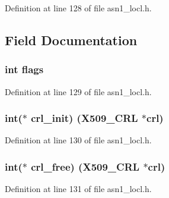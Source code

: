 Definition at line 128 of file asn1\+\_\+locl.\+h.



\subsection{Field Documentation}
\subsubsection[{\texorpdfstring{flags}{flags}}]{\setlength{\rightskip}{0pt plus 5cm}int flags}\hypertarget{structx509__crl__method__st_ac8bf36fe0577cba66bccda3a6f7e80a4}{}\label{structx509__crl__method__st_ac8bf36fe0577cba66bccda3a6f7e80a4}


Definition at line 129 of file asn1\+\_\+locl.\+h.

\subsubsection[{\texorpdfstring{crl\+\_\+init}{crl_init}}]{\setlength{\rightskip}{0pt plus 5cm}int($\ast$ crl\+\_\+init) ({\bf X509\+\_\+\+C\+RL} $\ast$crl)}\hypertarget{structx509__crl__method__st_ac05b012a3a4d030d014dc6f0a7e923c2}{}\label{structx509__crl__method__st_ac05b012a3a4d030d014dc6f0a7e923c2}


Definition at line 130 of file asn1\+\_\+locl.\+h.

\subsubsection[{\texorpdfstring{crl\+\_\+free}{crl_free}}]{\setlength{\rightskip}{0pt plus 5cm}int($\ast$ crl\+\_\+free) ({\bf X509\+\_\+\+C\+RL} $\ast$crl)}\hypertarget{structx509__crl__method__st_ac9f021c0c75991a0e922b8e37905bda4}{}\label{structx509__crl__method__st_ac9f021c0c75991a0e922b8e37905bda4}


Definition at line 131 of file asn1\+\_\+locl.\+h.

